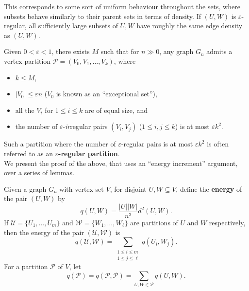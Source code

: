 			This corresponds to some sort of uniform behaviour throughout the sets, where subsets behave similarly to their parent sets in terms of density. If $(U,W)$ is $\varepsilon$-regular, all sufficiently large subsets of $U,W$ have roughly the same edge density as $(U,W)$.

			\begin{ftheo}
				\label{theo: szemeredi's regularity lemma}
				Given $0 < \varepsilon < 1$, there exists $M$ such that for $n\gg 0$, any graph $G_n$ admits a vertex partition $\mathcal{P} = (V_0, V_1, \ldots, V_k)$, where
				\begin{itemize}
					\item $k \le M$,
					\item $|V_0| \le \varepsilon n$ ($V_0$ is known as an ``exceptional set''),
					\item all the $V_i$ for $1\le i\le k$ are of equal size, and
					\item the number of $\varepsilon$-\emph{ir}regular pairs $(V_i,V_j)$ ($1 \le i,j\le k$) is at most $\varepsilon k^2$.
				\end{itemize}
			\end{ftheo}
			Such a partition where the number of $\varepsilon$-regular pairs is at most $\varepsilon k^2$ is often referred to as an \textbf{$\varepsilon$-regular partition}.\\

			We present the proof of the above, that uses an ``energy increment'' argument, over a series of lemmas.\\

			\begin{fdef}[Energy]
				Given a graph $G_n$ with vertex set $V$, for disjoint $U,W \subseteq V$, define the \textbf{energy} of the pair $(U,W)$ by
				\[ q(U,W) = \frac{|U||W|}{n^2} d^2(U,W). \]
				If $\mathcal{U} = \{U_1,\ldots,U_m\}$ and $\mathcal{W} = \{W_1,\ldots,W_\ell\}$ are partitions of $U$ and $W$ respectively, then the energy of the pair $(\mathcal{U},\mathcal{W})$ is
				\[ q(\mathcal{U},\mathcal{W}) = \sum_{\substack{1\le i\le m \\ 1 \le j \le \ell}} q(U_i,W_j). \]
				For a partition $\mathcal{P}$ of $V$, let
				\[ q(\mathcal{P}) = q(\mathcal{P},\mathcal{P}) = \sum_{U,W\in\mathcal{P}} q(U,W) . \]
			\end{fdef}

